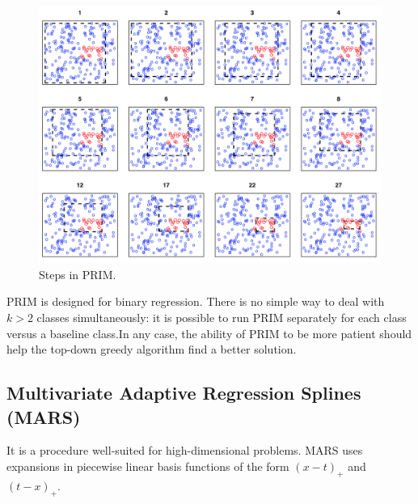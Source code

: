 \begin{figure}
\includegraphics[scale=0.4]{img/PRIM}
\caption{Steps in PRIM.}

\end{figure}
PRIM is designed for binary regression. There is no simple way to deal with $k>2$ classes simultaneously: it is possible to run PRIM separately for each class versus a baseline class.In any case, the ability of PRIM to be more patient should help the top-down greedy algorithm find a better solution.

\subsection{Multivariate Adaptive Regression Splines (MARS)}
It is a procedure well-suited for high-dimensional problems. MARS uses expansions in piecewise linear basis functions of the form $(x-t)_+$ and $(t-x)_+$.

